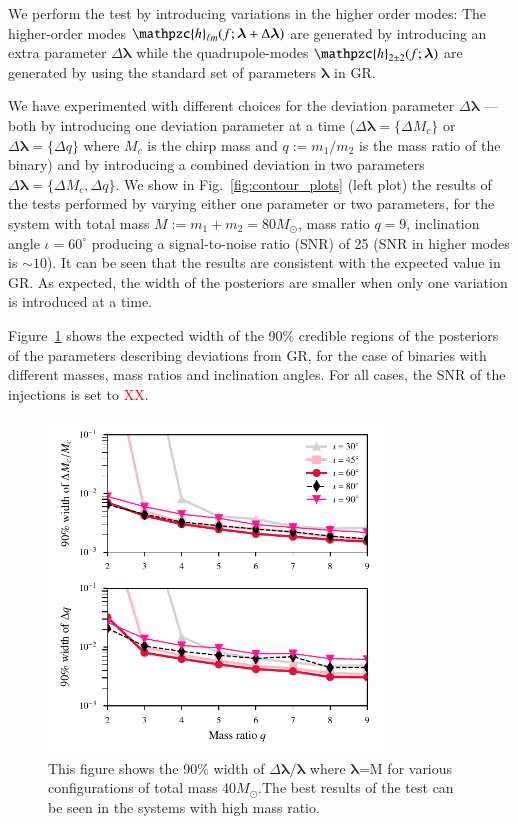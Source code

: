 \documentclass[prl,preprintnumbers,twocolumn,eqsecnum,floatfix,a4paper,nofootinbib,superscriptaddress]{revtex4}
\newcommand{\red}[1]{\textcolor{red}{#1}}
\newcommand{\h}{\mathpzc{h}}
\newcommand{\hlm}{\mathpzc{h}_{\ell m}}
\newcommand{\blambda}{\bm{\lambda}}
\begin{document}
We perform the test by introducing variations in the higher order modes: The higher-order modes $\hlm(f; \blambda+\Delta\blambda)$ are generated by introducing an extra parameter $\Delta\blambda$ while the quadrupole-modes $\h_{2\pm2}(f; \blambda)$ are generated by using the standard set of parameters $\blambda$ in GR. 

 We have experimented with different choices for the deviation parameter $\Delta\blambda$ --- both by introducing one deviation parameter at a time ($\Delta\blambda = \{\Delta M_c\}$ or $\Delta\blambda = \{\Delta q\}$ where $M_c$ is the chirp mass and $q := m_1/m_2$ is the mass ratio of the binary) and by introducing a combined deviation in two parameters $\Delta \blambda = \{\Delta M_c, \Delta q\}$. We show in Fig.~\ref{fig:contour_plots} (left plot) the results of the tests performed by varying either one parameter or two parameters, for the system with total mass $M := m_1 + m_2 = 80M_{\odot}$, mass ratio $q=9$, inclination angle $ {\iota}=60^{\circ} $ producing a signal-to-noise ratio  (SNR)  of 25 (SNR in higher modes is $\sim 10$). It can be seen that the results are consistent with the expected value in GR. As expected, the width of the posteriors are smaller when only one variation is introduced at a time. 

Figure~\ref{fig:dMc_dq_posteriors_gr} shows the expected width of the 90\% credible regions of the posteriors of the parameters describing deviations from GR, for the case of binaries with different masses, mass ratios and inclination angles. For all cases, the SNR of the injections is set to \red{XX}.  

\begin{figure}[h]
	\includegraphics*[width=3.5in]{figs/fig3.pdf}
	\caption{This figure shows the 90$\%$ width of $\Delta \blambda/\blambda$ where $\blambda$=M for various configurations of total mass $40M_{\odot}$.The best results of the test can be seen in the systems with high mass ratio.}
	\label{fig:dMc_dq_posteriors_gr}
\end{figure}
\end{document}
